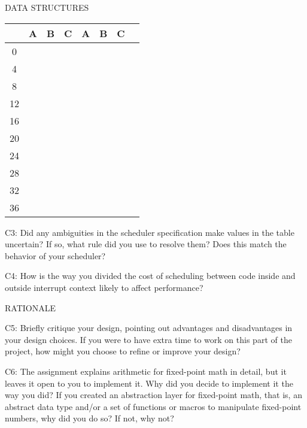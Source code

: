 \begin{aspect}{DATA STRUCTURES}
\begin{tabular}{|c|c|c|c|c|c|c|c|}
       & A                                           & B & C & A & B & C & \\
    \hline
    0  &                                             &   &   &   &   &   & \\
    \hline
    4  &                                             &   &   &   &   &   & \\
    \hline
    8  &                                             &   &   &   &   &   & \\
    \hline
    12 &                                             &   &   &   &   &   & \\
    \hline
    16 &                                             &   &   &   &   &   & \\
    \hline
    20 &                                             &   &   &   &   &   & \\
    \hline
    24 &                                             &   &   &   &   &   & \\
    \hline
    28 &                                             &   &   &   &   &   & \\
    \hline
    32 &                                             &   &   &   &   &   & \\
    \hline
    36 &                                             &   &   &   &   &   & \\
    \hline
  \end{tabular}

  \begin{qc}
    C3: Did any ambiguities in the scheduler specification make values in the table uncertain?  If so, what rule did you use to resolve them?  Does this match the behavior of your scheduler?
  \end{qc}
  \begin{qc}
    C4: How is the way you divided the cost of scheduling between code inside and outside interrupt context likely to affect performance?
  \end{qc}

\end{aspect}

\begin{aspect}{RATIONALE}
  \begin{qc}
    C5: Briefly critique your design, pointing out advantages and disadvantages in your design choices.  If you were to have extra time to work on this part of the project, how might you choose to refine or improve your design?
  \end{qc}

  \begin{qc}
    C6: The assignment explains arithmetic for fixed-point math in detail, but it leaves it open to you to implement it.  Why did you decide to implement it the way you did?  If you created an abstraction layer for fixed-point math, that is, an abstract data type and/or a set of functions or macros to manipulate fixed-point numbers, why did you do so?  If not, why not?
  \end{qc}

\end{aspect}